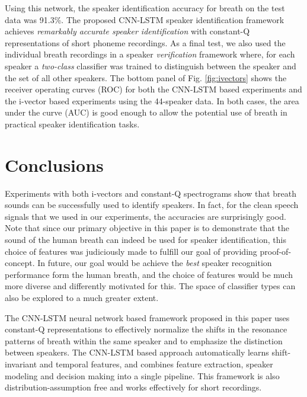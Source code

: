 \documentclass[a4paper]{article}
\begin{document}
Using this network, the speaker identification accuracy for breath on the test data was 91.3\%. The proposed CNN-LSTM speaker identification framework achieves \textit{remarkably accurate speaker identification} with constant-Q representations of short phoneme recordings. As a final test, we also used the individual breath recordings in a speaker {\em verification} framework where, for each speaker a {\em two-class} classifier was trained to distinguish between the speaker and the set of all other speakers. 
The bottom panel of Fig. \ref{fig:ivectors} shows the receiver operating curves (ROC) for both the CNN-LSTM based experiments and the i-vector based experiments using the 44-speaker data. In both cases, the area under the curve (AUC) is good enough to allow the potential use of breath in practical speaker identification tasks.

\section{Conclusions}
\label{sec:concl}
Experiments with both i-vectors and constant-Q spectrograms show that breath sounds can be successfully used to identify speakers. In fact, for the clean speech signals that we used in our experiments, the accuracies are surprisingly good. Note that since our primary objective in this paper is to demonstrate that the sound of the human breath can indeed be used for speaker identification, this choice of features was judiciously made to fulfill our goal of providing proof-of-concept. In future, our goal would be achieve the \textit{best} speaker recognition performance form the human breath, and the choice of features would be much more diverse and differently motivated for this. The space of classifier types can also be explored to a much greater extent.

The CNN-LSTM neural network based framework proposed in this paper uses constant-Q representations to effectively normalize the shifts in the resonance patterns of breath within the same speaker and to emphasize the distinction between speakers. The CNN-LSTM based approach automatically learns shift-invariant and temporal features, and combines feature extraction, speaker modeling and decision making into a single pipeline. This framework is also distribution-assumption free and works effectively for short recordings. 

\clearpage
\newpage
\pagebreak




\end{document}
